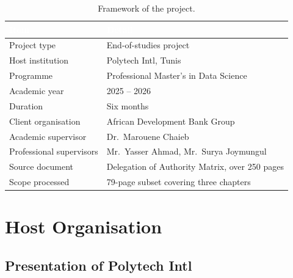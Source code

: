 \begin{table}[h]
\centering
\caption{Framework of the project.}
\label{tab:framework}
\begin{tabular}{|p{}|p{}|}
\hline
\rowcolor{myblue}\textcolor{white}{\textbf{Item}} & \textcolor{white}{\textbf{Detail}} \\
\hline
Project type & End-of-studies project \\ \hline
Host institution & Polytech Intl, Tunis \\ \hline
Programme & Professional Master's in Data Science \\ \hline
Academic year & 2025 -- 2026 \\ \hline
Duration & Six months \\ \hline
Client organisation & African Development Bank Group \\ \hline
Academic supervisor & Dr.~Marouene Chaieb \\ \hline
Professional supervisors & Mr.~Yasser Ahmad, Mr.~Surya Joymungul \\ \hline
Source document & Delegation of Authority Matrix, over 250 pages \\ \hline
Scope processed & 79-page subset covering three chapters \\ \hline
\end{tabular}
\end{table}

\section{Host Organisation}


\subsection{Presentation of Polytech Intl}



